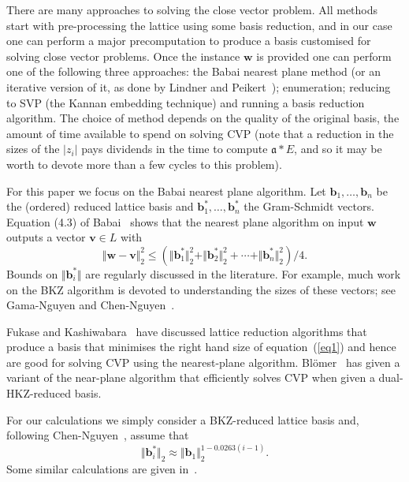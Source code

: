 \documentclass{llncs}
\newcommand{\FF}{\mathcal{F}}
\newcommand{\Z}{\mathbb{Z}}
\renewcommand{\a}{\mathfrak{a}}
\newcommand{\bb}{\mathbf{b}}
\renewcommand{\v}{\mathbf{v}}
\newcommand{\w}{\mathbf{w}}
\newcommand{\z}{\mathbf{z}}
\begin{document}
There are many approaches to solving the close vector problem.
All methods start with pre-processing the lattice using some basis reduction, and in our case one can perform a major precomputation to produce a basis customised for solving close vector problems.
Once the instance $\w$ is provided one can perform one of the following three approaches: the Babai nearest plane method (or an iterative version of it, as done by Lindner and Peikert~\cite{LP11}); enumeration; reducing to SVP (the Kannan embedding technique) and running a basis reduction algorithm.
The choice of method depends on the quality of the original basis, the amount of time available to spend on solving CVP (note that a reduction in the sizes of the $|z_i|$ pays dividends in the time to compute $\a * E$, and so it may be worth to devote more than a few cycles to this problem).

For this paper we focus on the Babai nearest plane algorithm.
Let $\bb_1, \dots, \bb_n$ be the (ordered) reduced lattice basis and $\bb_1^*, \dots, \bb_n^*$ the Gram-Schmidt vectors.
Equation (4.3) of Babai~\cite{Bab86} shows that the nearest plane algorithm on input $\w$ outputs a vector $\v \in L$ with
\begin{equation} \label{eq1}
    \Vert \w -\v \Vert_2^2 \le (\Vert \bb_1^*\Vert_2^2 + \Vert \bb_2^*\Vert_2^2 + \cdots + \Vert \bb_n^*\Vert_2^2 )/4 .
\end{equation}
Bounds on $\Vert \bb_i^* \Vert$ are regularly discussed in the literature. For example, much work on the BKZ algorithm is devoted to understanding the sizes of these vectors; see Gama-Nguyen and Chen-Nguyen~\cite{CN11}.

Fukase and Kashiwabara~\cite{FK15} have discussed lattice reduction algorithms that produce a basis that minimises the right hand size of equation~(\ref{eq1}) and hence are good for solving CVP using the nearest-plane algorithm.
Bl{\"o}mer~\cite{Blo00} has given a variant of the near-plane algorithm that efficiently solves CVP when given a dual-HKZ-reduced basis.


For our calculations we simply consider a BKZ-reduced lattice basis and, following Chen-Nguyen~\cite{CN11}, assume that
\[
   \Vert \bb_i^* \Vert_2 \approx \Vert \bb_1 \Vert_2^{1 - 0.0263(i-1)}.
\]
Some similar calculations are given in~\cite{BS18}.


\end{document}
